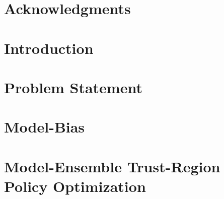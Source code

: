 \documentclass[ titlepage,numbers=noenddot,headinclude,
                footinclude=true,cleardoublepage=empty,abstractoff,
                BCOR=5mm,paper=letter,fontsize=12pt,
                american,
                openany
                ]{scrreprt}
\begin{document}
\frenchspacing
\raggedbottom
{}







\setcounter{page}{1}%

% 

\begingroup
\let\clearpage\relax
\let\cleardoublepage\relax
\let\cleardoublepage\relax
\chapter*{Acknowledgments}

\endgroup


\pagestyle{firstpage}



\setcounter{page}{1}

\chapter{Introduction}\label{chapter:intro}


\chapter{Problem Statement}\label{chapter:prob-statement}


\chapter{Model-Bias}\label{chapter:model-bias}


\chapter{Model-Ensemble Trust-Region Policy Optimization}\label{chapter:metrpo}

\end{document}

